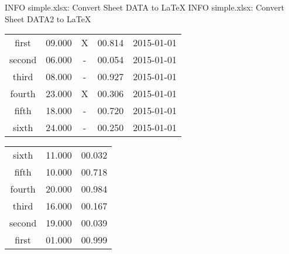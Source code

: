  INFO simple.xlsx: Convert Sheet DATA to LaTeX
 INFO simple.xlsx: Convert Sheet DATA2 to LaTeX
%
%


%
%
\begin{tabular}{c|c|c|c|c|}
first & 09.000 & X & 00.814 & 2015-01-01\\
second & 06.000 & - & 00.054 & 2015-01-01\\
third & 08.000 & - & 00.927 & 2015-01-01\\
fourth & 23.000 & X & 00.306 & 2015-01-01\\
fifth & 18.000 & - & 00.720 & 2015-01-01\\
sixth & 24.000 & - & 00.250 & 2015-01-01
\end{tabular}

%
%
\begin{tabular}{c|c|c|}
sixth & 11.000 & 00.032\\
fifth & 10.000 & 00.718\\
fourth & 20.000 & 00.984\\
third & 16.000 & 00.167\\
second & 19.000 & 00.039\\
first & 01.000 & 00.999
\end{tabular}
